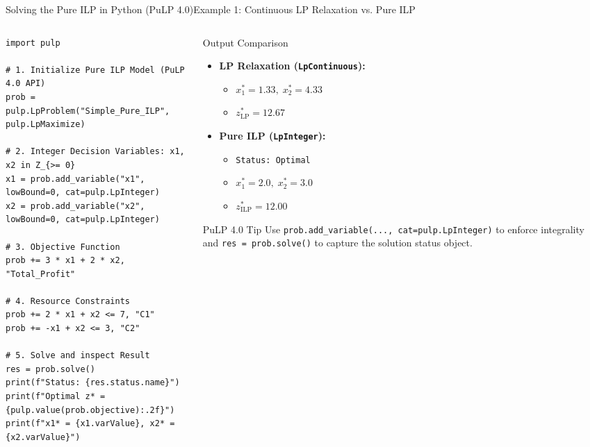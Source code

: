 \documentclass[aspectratio=169]{beamer}
\begin{document}
\begin{frame}[fragile]{Solving the Pure ILP in Python (PuLP 4.0)}{Example 1: Continuous LP Relaxation vs. Pure ILP}
\begin{columns}[T]
\begin{column}{0.56\textwidth}
\begin{lstlisting}
import pulp

# 1. Initialize Pure ILP Model (PuLP 4.0 API)
prob = pulp.LpProblem("Simple_Pure_ILP", pulp.LpMaximize)

# 2. Integer Decision Variables: x1, x2 in Z_{>= 0}
x1 = prob.add_variable("x1", lowBound=0, cat=pulp.LpInteger)
x2 = prob.add_variable("x2", lowBound=0, cat=pulp.LpInteger)

# 3. Objective Function
prob += 3 * x1 + 2 * x2, "Total_Profit"

# 4. Resource Constraints
prob += 2 * x1 + x2 <= 7, "C1"
prob += -x1 + x2 <= 3, "C2"

# 5. Solve and inspect Result
res = prob.solve()
print(f"Status: {res.status.name}")
print(f"Optimal z* = {pulp.value(prob.objective):.2f}")
print(f"x1* = {x1.varValue}, x2* = {x2.varValue}")
\end{lstlisting}
\end{column}
\begin{column}{0.41\textwidth}
\begin{block}{Output Comparison}
\footnotesize
\begin{itemize}
  \item \textbf{LP Relaxation (\texttt{LpContinuous}):}
  \begin{itemize}
    \scriptsize
    \item $x_1^* = 1.33, \; x_2^* = 4.33$
    \item $z_{\text{LP}}^* = 12.67$
  \end{itemize}
  \item \textbf{Pure ILP (\texttt{LpInteger}):}
  \begin{itemize}
    \scriptsize
    \item \texttt{Status: Optimal}
    \item $x_1^* = 2.0, \; x_2^* = 3.0$
    \item $z_{\text{ILP}}^* = \mathbf{12.00}$
  \end{itemize}
\end{itemize}
\end{block}
\begin{alertblock}{PuLP 4.0 Tip}
\scriptsize
Use \texttt{prob.add\_variable(..., cat=pulp.LpInteger)} to enforce integrality and \texttt{res = prob.solve()} to capture the solution status object.
\end{alertblock}
\end{column}
\end{columns}
\end{frame}
\end{document}
